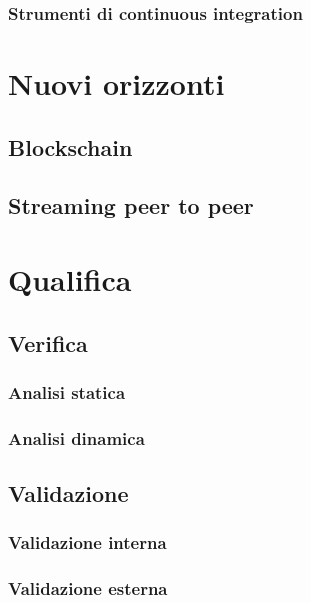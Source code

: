       \subsubsection{Strumenti di continuous integration}
\section{Nuovi orizzonti}
   \subsection{Blockschain}
   \subsection{Streaming peer to peer}

\section{Qualifica}
   \subsection{Verifica}
      \subsubsection{Analisi statica}
      \subsubsection{Analisi dinamica}
   \subsection{Validazione}
      \subsubsection{Validazione interna}
      \subsubsection{Validazione esterna}
